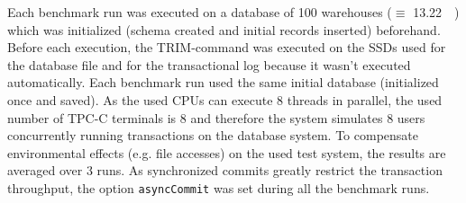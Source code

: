     Each benchmark run was executed on a database of 100 warehouses ($\equiv$ \SI{13.22}{\gibi\byte}) which was initialized (schema created and initial records inserted) beforehand. Before each execution, the TRIM-command was executed on the SSDs used for the database file and for the transactional log because it wasn't executed automatically. Each benchmark run used the same initial database (initialized once and saved). As the used CPUs can execute 8 threads in parallel, the used number of TPC-C terminals is 8 and therefore the system simulates 8 users concurrently running transactions on the database system. To compensate environmental effects (e.g. file accesses) on the used test system, the results are averaged over 3 runs. As synchronized commits greatly restrict the transaction throughput, the option \lstinline{asyncCommit} was set during all the benchmark runs.

